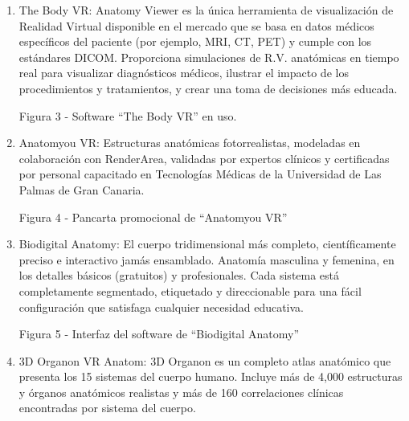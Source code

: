 \documentclass[11pt]{report}
\begin{document}
\begin{enumerate}
\item The Body VR: Anatomy Viewer es la única herramienta de visualización de Realidad Virtual disponible en el mercado que se basa en datos médicos específicos del paciente (por ejemplo, MRI, CT, PET) y cumple con los estándares DICOM. Proporciona simulaciones de R.V. anatómicas en tiempo real para visualizar diagnósticos médicos, ilustrar el impacto de los procedimientos y tratamientos, y crear una toma de decisiones más educada.

Figura 3 - Software “The Body VR” en uso.

\item Anatomyou VR: Estructuras anatómicas fotorrealistas, modeladas en colaboración con RenderArea, validadas por expertos clínicos y certificadas por personal capacitado en  Tecnologías Médicas de la Universidad de Las Palmas de Gran Canaria.

Figura 4 -  Pancarta promocional de “Anatomyou VR” 

\item Biodigital Anatomy: El cuerpo tridimensional más completo, científicamente preciso e interactivo jamás ensamblado. Anatomía masculina y femenina, en los detalles básicos (gratuitos) y profesionales. Cada sistema está completamente segmentado, etiquetado y direccionable para una fácil configuración que satisfaga cualquier necesidad educativa.


Figura 5 - Interfaz del software de “Biodigital Anatomy”

\item 3D Organon VR Anatom: 3D Organon es un completo atlas anatómico que presenta los 15 sistemas del cuerpo humano. Incluye más de 4,000 estructuras y órganos anatómicos realistas y más de 160 correlaciones clínicas encontradas por sistema del cuerpo.

\end{enumerate}






 
 
\end{document}
